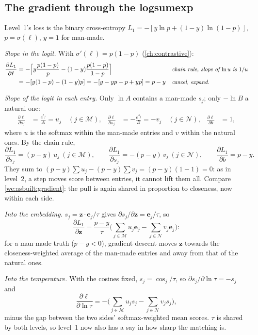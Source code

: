 \documentclass[11pt,a4paper,oneside,openany]{book}
\newcommand{\B}[1]{{\symbf{#1}}}
\newcommand{\B}[1]{{\bm{#1}}}
\newcommand{\ve}{\B{e}}
\newcommand{\vz}{\B{z}}
\newcommand{\why}[1]{&&\text{\small\itshape #1}}
\begin{document}
\subsection{The gradient through the logsumexp}

Level~1's loss is the binary cross-entropy $L_1=-[y\ln p+(1-y)\ln(1-p)]$, $p=\sigma(\ell)$, $y=1$ for man-made.

\emph{Slope in the logit.} With $\sigma'(\ell)=p(1-p)$ (\cref{ch:contrastive}):
\begin{align*}
\frac{\partial L_1}{\partial\ell} &= -\Big[y\frac{p(1-p)}{p}-(1-y)\frac{p(1-p)}{1-p}\Big] \why{chain rule, slope of $\ln u$ is $1/u$}\\
&= -[y(1-p)-(1-y)p] = -[y-yp-p+yp] = p-y \why{cancel, expand.}
\end{align*}

\emph{Slope of the logit in each entry.} Only $\ln A$ contains a man-made $s_j$; only $-\ln B$ a natural one:
\begin{align*}
\frac{\partial\ell}{\partial s_j} &= \frac{e^{s_j}}{A}=u_j\quad(j\in\mathcal M), &
\frac{\partial\ell}{\partial s_j} &= -\frac{e^{s_j}}{B}=-v_j\quad(j\in\mathcal N), &
\frac{\partial\ell}{\partial b} &= 1,
\end{align*}
where $u$ is the softmax within the man-made entries and $v$ within the natural ones. By the chain rule,
\begin{equation}
\frac{\partial L_1}{\partial s_j}=(p-y)\,u_j\ (j\in\mathcal M),\qquad \frac{\partial L_1}{\partial s_j}=-(p-y)\,v_j\ (j\in\mathcal N),\qquad
\frac{\partial L_1}{\partial b}=p-y .
\label{eq:asbuilt:l1grad}
\end{equation}
They sum to $(p-y)\sum u_j-(p-y)\sum v_j=(p-y)(1-1)=0$: as in level~2, a step moves score between entries, it cannot lift them all. Compare \cref{we:asbuilt:gradient}: the
pull is again shared in proportion to closeness, now within each side.

\emph{Into the embedding.} $s_j=\vz\cdot\ve_j/\tau$ gives $\partial s_j/\partial\vz=\ve_j/\tau$, so
\[
\frac{\partial L_1}{\partial\vz}=\frac{p-y}{\tau}\Big(\sum_{j\in\mathcal M}u_j\ve_j-\sum_{j\in\mathcal N}v_j\ve_j\Big):
\]
for a man-made truth ($p-y<0$), gradient descent moves $\vz$ towards the closeness-weighted average of the man-made entries and away from that of the natural ones.

\emph{Into the temperature.} With the cosines fixed, $s_j=\cos_j/\tau$, so $\partial s_j/\partial\ln\tau=-s_j$ and
\[
\frac{\partial\ell}{\partial\ln\tau}=-\Big(\sum_{j\in\mathcal M}u_js_j-\sum_{j\in\mathcal N}v_js_j\Big),
\]
minus the gap between the two sides' softmax-weighted mean scores. $\tau$ is shared by both levels, so level~1 now also has a say in how sharp the matching is.
\end{document}
